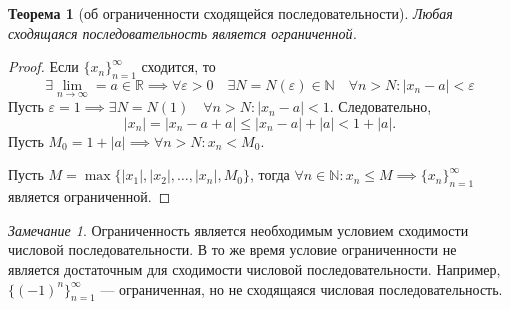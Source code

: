 \documentclass[a4paper,12pt]{article} %
\newtheorem{theorem}{Теорема}[subsection]
\theoremstyle{remark}
\newtheorem*{remark}{Замечание}
\begin{document}
\begin{theorem}[об ограниченности сходящейся последовательности]
	Любая сходящаяся последовательность является ограниченной.	
	\begin{center}
	\end{center}
\end{theorem}
\begin{proof}
	Если $\{x_n\}_{n=1}^{\infty}$ сходится, то 
	\[
	\exists \lim_{n \to \infty} = a\in \mathbb{R} \implies \forall \varepsilon>0 \quad \exists N=N(\varepsilon)\in \mathbb{N} \quad \forall n>N : |x_{n}-a|<\varepsilon
	\]
	Пусть $\varepsilon = 1 \implies \exists N=N(1) \quad \forall n>N : |x_{n}-a| < 1$. Следовательно,
	\[
	|x_{n}| = |x_{n}-a+a| \le |x_{n}-a|+|a| < 1+|a|
	.\] 
	Пусть $M_0=1+|a| \implies \forall n>N : x_{n} < M_0$. 
	
	\noindent Пусть $M=\max\{|x_1|, |x_2|, \ldots, |x_{n}|, M_0\}$, тогда $\forall n\in \mathbb{N} : x_{n}\le M\implies \{x_n\}_{n=1}^{\infty}$ является ограниченной.
\end{proof}

\begin{remark}
	Ограниченность является необходимым условием сходимости числовой последовательности. В то же время условие ограниченности не является достаточным для сходимости числовой последовательности.
	Например, $\{(-1)^n\}_{n=1}^{\infty}$ --- ограниченная, но не сходящаяся числовая последовательность.
\end{remark}
\end{document}
